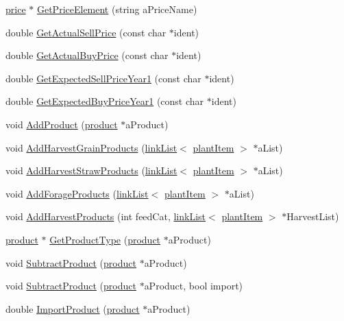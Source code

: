 \begin{DoxyCompactItemize}
\item 
\hyperlink{classprice}{price} $\ast$ \hyperlink{classproducts_a3a34b70e01258e1a19d8c68010c41d83}{GetPriceElement} (string aPriceName)
\item 
double \hyperlink{classproducts_a7d77ad348aa0f59a569c5c2debda2052}{GetActualSellPrice} (const char $\ast$ident)
\item 
double \hyperlink{classproducts_a9c32b675c87621466456bca5bff218f7}{GetActualBuyPrice} (const char $\ast$ident)
\item 
double \hyperlink{classproducts_ae122edd26460705dc0c598c8ce8cf488}{GetExpectedSellPriceYear1} (const char $\ast$ident)
\item 
double \hyperlink{classproducts_aca468b27ede7c7abfb58d543acd78f5e}{GetExpectedBuyPriceYear1} (const char $\ast$ident)
\item 
void \hyperlink{classproducts_a3b57167d8acbc0ad1d9fd4bdb1e7ce2a}{AddProduct} (\hyperlink{classproduct}{product} $\ast$aProduct)
\item 
void \hyperlink{classproducts_a378d30f83ce852844803d549e13eee31}{AddHarvestGrainProducts} (\hyperlink{classlink_list}{linkList}$<$ \hyperlink{classplant_item}{plantItem} $>$ $\ast$aList)
\item 
void \hyperlink{classproducts_a64468cfd7fcbe94794b6d22a59781781}{AddHarvestStrawProducts} (\hyperlink{classlink_list}{linkList}$<$ \hyperlink{classplant_item}{plantItem} $>$ $\ast$aList)
\item 
void \hyperlink{classproducts_aa66cc6700d84a9bb9a88915d4b8156de}{AddForageProducts} (\hyperlink{classlink_list}{linkList}$<$ \hyperlink{classplant_item}{plantItem} $>$ $\ast$aList)
\item 
void \hyperlink{classproducts_a4b770aa23aa5b30ceec044586c6d02b9}{AddHarvestProducts} (int feedCat, \hyperlink{classlink_list}{linkList}$<$ \hyperlink{classplant_item}{plantItem} $>$ $\ast$HarvestList)
\item 
\hyperlink{classproduct}{product} $\ast$ \hyperlink{classproducts_a9f4a3b9df4fac4f10e004bcca01fa2a0}{GetProductType} (\hyperlink{classproduct}{product} $\ast$aProduct)
\item 
void \hyperlink{classproducts_a85731ae226d4e23d1b83d4fa936e12e3}{SubtractProduct} (\hyperlink{classproduct}{product} $\ast$aProduct)
\item 
void \hyperlink{classproducts_a87b32cc7b19b4082bf4ee0c7f01baafc}{SubtractProduct} (\hyperlink{classproduct}{product} $\ast$aProduct, bool import)
\item 
double \hyperlink{classproducts_a054d0246f5e9cca276a7bc117c7fbfe5}{ImportProduct} (\hyperlink{classproduct}{product} $\ast$aProduct)

\end{DoxyCompactItemize}
